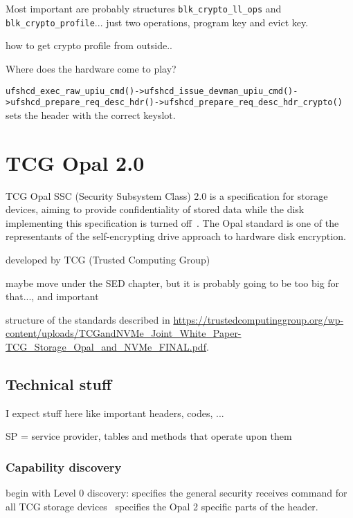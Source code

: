 \documentclass[
  digital, %
  oneside, %
  nolof,     %
  nolot,     %
]{fithesis4}
\begin{document}
Most important are probably structures \verb|blk_crypto_ll_ops| and \verb|blk_crypto_profile|... just two operations, program key and evict key. 



how to get crypto profile from outside..




Where does the hardware come to play?

\verb|ufshcd_exec_raw_upiu_cmd()->ufshcd_issue_devman_upiu_cmd()->ufshcd_prepare_req_desc_hdr()->ufshcd_prepare_req_desc_hdr_crypto()| sets the header with the correct keyslot.

\chapter{TCG Opal 2.0}

TCG Opal SSC (Security Subsystem Class) 2.0 is a specification for storage devices, aiming to provide confidentiality of stored data while the disk implementing this specification is turned off~\cite{tcg-opal2}. The Opal standard is one of the representants of the self-encrypting drive approach to hardware disk encryption.

developed by TCG (Trusted Computing Group)

maybe move under the SED chapter, but it is probably going to be too big for that..., and important


structure of the standards described in \url{https://trustedcomputinggroup.org/wp-content/uploads/TCGandNVMe_Joint_White_Paper-TCG_Storage_Opal_and_NVMe_FINAL.pdf}.



\section{Technical stuff}

I expect stuff here like important headers, codes, ...

SP = service provider, tables and methods that operate upon them

\subsection{Capability discovery}

begin with Level 0 discovery: \parencite[3.3.6]{tcg-storage-core} specifies the general security receives command for all TCG storage devices~\cite[3.1.1]{tcg-opal2} specifies the Opal 2 specific parts of the header.
\end{document}

